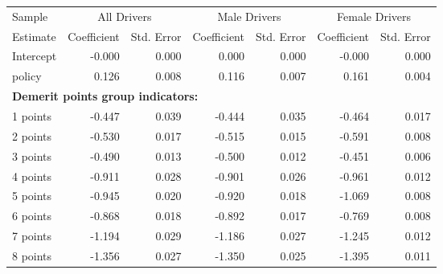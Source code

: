 
\begin{table}%
\centering 
\begin{tabular}{l r r r r r r} 

\hline 
 

Sample 
 & \multicolumn{2}{c}{All  Drivers}  & \multicolumn{2}{c}{Male  Drivers}  & \multicolumn{2}{c}{Female  Drivers}   \\ 
 

 \cmidrule(lr){1-1}\cmidrule(lr){2-3}\cmidrule(lr){4-5}\cmidrule(lr){6-7} 

Estimate  & Coefficient & Std. Error  & Coefficient & Std. Error  & Coefficient & Std. Error   \\ 
 

\hline 
 
Intercept  & -0.000  &  0.000  &  0.000  &  0.000  & -0.000  &  0.000   \\ 
 
policy  &  0.126  &  0.008  &  0.116  &  0.007  &  0.161  &  0.004   \\ 
 

\hline 
 
\multicolumn{4}{l}{\textbf{Demerit points group indicators:}}  \\ 
 
1 points  & -0.447  &  0.039  & -0.444  &  0.035  & -0.464  &  0.017   \\ 
 
2 points  & -0.530  &  0.017  & -0.515  &  0.015  & -0.591  &  0.008   \\ 
 
3 points  & -0.490  &  0.013  & -0.500  &  0.012  & -0.451  &  0.006   \\ 
 
4 points  & -0.911  &  0.028  & -0.901  &  0.026  & -0.961  &  0.012   \\ 
 
5 points  & -0.945  &  0.020  & -0.920  &  0.018  & -1.069  &  0.008   \\ 
 
6 points  & -0.868  &  0.018  & -0.892  &  0.017  & -0.769  &  0.008   \\ 
 
7 points  & -1.194  &  0.029  & -1.186  &  0.027  & -1.245  &  0.012   \\ 
 
8 points  & -1.356  &  0.027  & -1.350  &  0.025  & -1.395  &  0.011   \\ 
 

\end{tabular}
\end{table}
